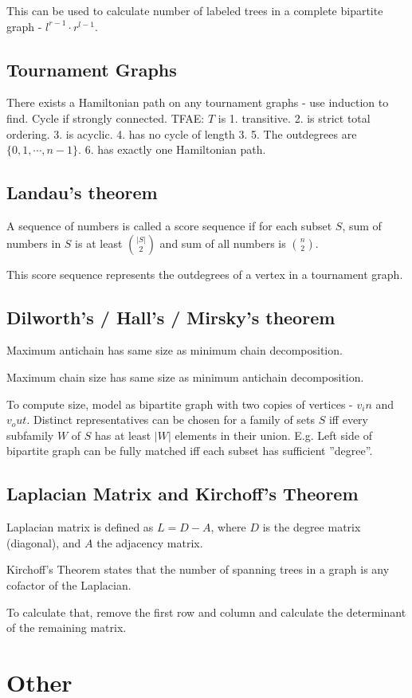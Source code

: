 	This can be used to calculate number of labeled trees in a complete bipartite graph - $l^{r-1}\cdot r^{l-1}$.

	\subsection{Tournament Graphs}
	There exists a Hamiltonian path on any tournament graphs - use induction to find. Cycle if strongly connected. TFAE:
	$T$ is 1. transitive. 2. is strict total ordering. 3. is acyclic. 4. has no cycle of length $3$. 5. The outdegrees are $\{0, 1, \cdots, n-1\}$.
	 6. has exactly one Hamiltonian path.

	\subsection{Landau's theorem}
	A sequence of numbers is called a score sequence if for each subset $S$, sum of 
	numbers in $S$ is at least $\binom{|S|}{2}$ and sum of all numbers is $\binom{n}{2}$.

	This score sequence represents the outdegrees of a vertex in a tournament graph.

	\subsection{Dilworth's / Hall's / Mirsky's theorem}
	Maximum antichain has same size as minimum chain decomposition.

	Maximum chain size has same size as minimum antichain decomposition.

	To compute size, model as bipartite graph with two copies of vertices - $v_in$ and $v_out$.
	Distinct representatives can be chosen for a family of sets $S$ iff every subfamily $W$ of $S$ has at least $|W|$
	elements in their union. E.g. Left side of bipartite graph can be fully matched iff each subset has sufficient ”degree”.

	\subsection{Laplacian Matrix and Kirchoff’s Theorem}
	Laplacian matrix is defined as $L = D - A$, where $D$ is the degree matrix (diagonal), and $A$ the adjacency matrix.

	Kirchoff’s Theorem states that the number of spanning trees in a graph is any cofactor of the Laplacian.

	To calculate that, remove the first row and column and calculate the determinant of the remaining matrix.

\section{Other}
